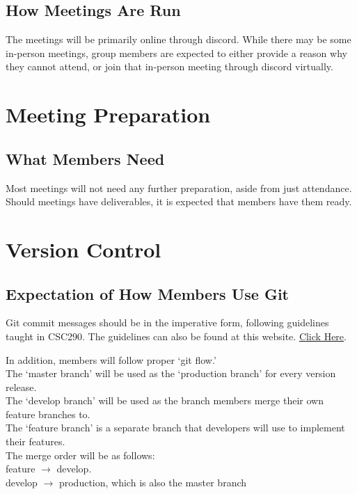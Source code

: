 \documentclass[hidelinks, 12pt]{article}    %
\begin{document}
        \subsection{How Meetings Are Run}
            The meetings will be primarily online through discord. While there may be some in-person meetings,
            group members are expected to either provide a reason why they cannot attend, or join that
            in-person meeting through discord virtually.

    \section{Meeting Preparation}
        \subsection{What Members Need}
            Most meetings will not need any further preparation, aside from just attendance.
            Should meetings have deliverables, it is expected that members have them ready.
            
    \pagebreak

    \section{Version Control}
        \subsection{Expectation of How Members Use Git}
            Git commit messages should be in the imperative form, following guidelines taught in CSC290.
            The guidelines can also be found at this website. \href{https://cbea.ms/git-commit/}{Click Here}.

            In addition, members will follow proper `git flow.'  \\
            The `master branch' will be used as the `production branch' for every version release. \\
            The `develop branch' will be used as the branch members merge their own feature branches to. \\
            The `feature branch' is a separate branch that developers will use to implement their features. \\
            
            The merge order will be as follows: \\
            feature $\rightarrow$ develop. \\
            develop $\rightarrow$ production, which is also the master branch
        
\end{document}
